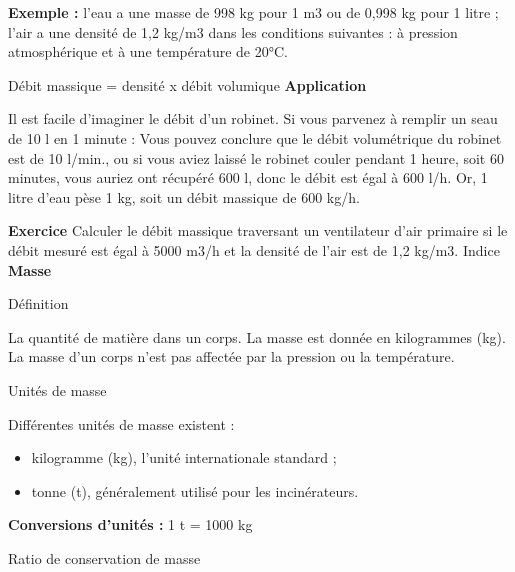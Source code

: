 \textbf{Exemple :} l'eau a une masse de 998 kg pour 1 m3 ou de 0,998 kg pour 1 litre ; l'air a une densité de 1,2 kg/m3 dans les conditions suivantes : à pression atmosphérique et à une température de 20°C.

Débit massique = densité x débit volumique
\vspace{0.3cm}
\textbf{Application}
\vspace{0.3cm}

Il est facile d'imaginer le débit d'un robinet. Si vous parvenez à remplir un seau de 10 l en 1 minute : Vous pouvez conclure que le débit volumétrique du robinet est de 10 l/min., ou si vous aviez laissé le robinet couler pendant 1 heure, soit 60 minutes, vous auriez ont récupéré 600 l, donc le débit est égal à 600 l/h.
Or, 1 litre d'eau pèse 1 kg, soit un débit massique de 600 kg/h.

\vspace{0.3cm}
\textbf{Exercice}
\vspace{0.3cm}
Calculer le débit massique traversant un ventilateur d'air primaire si le débit mesuré est égal à 5000 m3/h et la densité de l'air est de 1,2 kg/m3.
Indice
\vspace{0.3cm}
\textbf{Masse}

\vspace{0.3cm}
Définition
\vspace{0.3cm}

La quantité de matière dans un corps. La masse est donnée en kilogrammes (kg).
La masse d'un corps n'est pas affectée par la pression ou la température.

\vspace{0.3cm}
Unités de masse
\vspace{0.3cm}

Différentes unités de masse existent :
\begin{itemize}
 

\item kilogramme (kg), l'unité internationale standard ;
 \item tonne (t), généralement utilisé pour les incinérateurs.
   
\end{itemize}

\vspace{0.3cm}
\textbf{Conversions d'unités :}
\vspace{0.3cm}
1 t = 1000 kg

\vspace{0.3cm}
Ratio de conservation de masse
\vspace{0.3cm}

